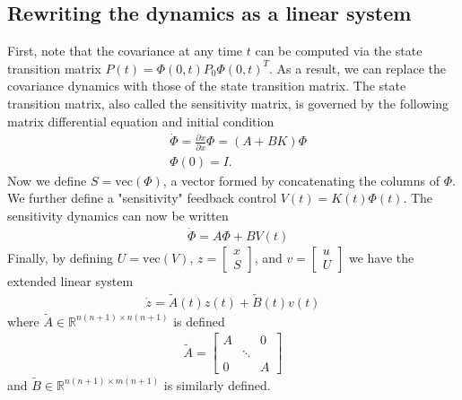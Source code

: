 \documentclass[10pt,a4paper]{article}
\begin{document}
	\subsection{Rewriting the dynamics as a linear system}
	First, note that the covariance at any time $t$ can be computed via the state transition matrix $P(t) = \Phi(0, t)P_0\Phi(0, t)^T$. As a result, we can replace the covariance dynamics with those of the state transition matrix. The state transition matrix, also called the sensitivity matrix, is governed by the following matrix differential equation and initial condition
	\begin{align}
	&\dot{\Phi} = \frac{\partial \dot{x}}{\partial x}\Phi = (A+BK)\Phi \\
	&\Phi(0) = I. 
	\end{align}
	Now we define $S = \mathrm{vec}(\Phi)$, a vector formed by concatenating the columns of $\Phi$. We further define a "sensitivity" feedback control $V(t) = K(t)\Phi(t)$. The sensitivity dynamics can now be written
		\begin{align}
	&\dot{\Phi} = A\Phi + BV(t)
	\end{align}
 Finally, by defining $U = \mathrm{vec}(V)$, $z = \begin{bmatrix}
	x \\ S
	\end{bmatrix}$, and  $ v = \begin{bmatrix}
	u \\ U
	\end{bmatrix}$ we have the extended linear system 
		\begin{align}
	\dot{z} = \tilde{A}(t)z(t) + \tilde{B}(t)v(t) 
	\end{align}
	where $\tilde{A}\in \mathbb{R}^{n(n+1) \times n(n+1)}$ is defined 
	\begin{align}
	\tilde{A} = 
	\begin{bmatrix}
	A & & 0 \\
	& \ddots \\
	0 &  & A
	\end{bmatrix}
	\end{align} and $\tilde{B} \in \mathbb{R}^{n(n+1) \times m(n+1)}$ is similarly defined.
	
\end{document}
